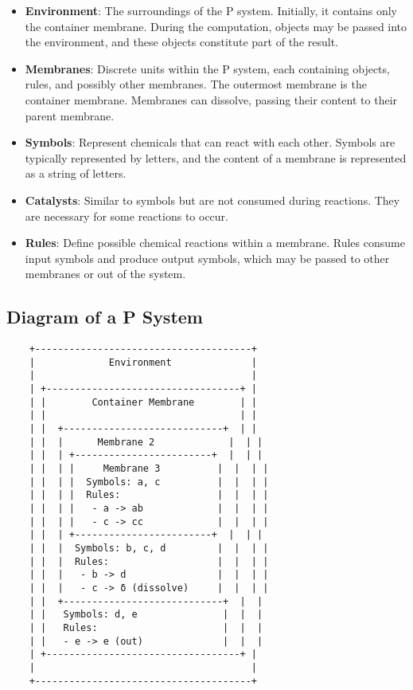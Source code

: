 \documentclass[12pt, oneside]{book}
\begin{document}
\begin{itemize}
	\item \textbf{Environment}: The surroundings of the P system. Initially, it contains only the container membrane. During the computation, objects may be passed into the environment, and these objects constitute part of the result.
	\item \textbf{Membranes}: Discrete units within the P system, each containing objects, rules, and possibly other membranes. The outermost membrane is the container membrane. Membranes can dissolve, passing their content to their parent membrane.
	\item \textbf{Symbols}: Represent chemicals that can react with each other. Symbols are typically represented by letters, and the content of a membrane is represented as a string of letters.
	\item \textbf{Catalysts}: Similar to symbols but are not consumed during reactions. They are necessary for some reactions to occur.
	\item \textbf{Rules}: Define possible chemical reactions within a membrane. Rules consume input symbols and produce output symbols, which may be passed to other membranes or out of the system.
\end{itemize}

\subsection{Diagram of a P System}

\begin{verbatim}
	+--------------------------------------+
	|             Environment              |
	|                                      |
	| +----------------------------------+ |
	| |        Container Membrane        | |
	| |                                  | |
	| |  +----------------------------+  | |
	| |  |      Membrane 2             |  | |
	| |  | +------------------------+  |  | |
	| |  | |     Membrane 3          |  |  | |
	| |  | |  Symbols: a, c          |  |  | |
	| |  | |  Rules:                 |  |  | |
	| |  | |   - a -> ab             |  |  | |
	| |  | |   - c -> cc             |  |  | |
	| |  | +------------------------+  |  | |
	| |  |  Symbols: b, c, d         |  |  | |
	| |  |  Rules:                   |  |  | |
	| |  |   - b -> d                |  |  | |
	| |  |   - c -> δ (dissolve)     |  |  | |
	| |  +----------------------------+  |  |
	| |   Symbols: d, e               |  |  |
	| |   Rules:                      |  |  |
	| |   - e -> e (out)              |  |  |
	| +----------------------------------+ |
	|                                      |
	+--------------------------------------+
\end{verbatim}
\end{document}
